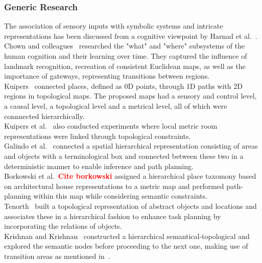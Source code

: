 \documentclass[twocolumn,letterpaper]{IEEEAerospaceCLS}  %
\newcommand\todo[1]{\textbf{\textcolor{red}{#1}}}
\begin{document}
\subsubsection{Generic Research} \label{sssec:ResLitHist}
The association of sensory inputs with symbolic systems and intricate representations has been discussed from a cognitive viewpoint by Harnad et al.~\cite{harnad_symbol_1990}.\\
Chown and colleagues~\cite{chown_prototypes_1995} researched the "what" and "where" subsystems of the human cognition and their learning over time. They captured the influence of landmark recognition, recreation of consistent Euclidean maps, as well as the importance of gateways, representing transitions between regions.\\
Kuipers~\cite{kuipers_spatial_2000} connected places, defined as 0D points, through 1D paths with 2D regions in topological maps. The proposed maps had a sensory and control level, a causal level, a topological level and a metrical level, all of which were connnected hierarchically.\\ Kuipers et al.~\cite{kuipers_local_2004} also conducted experiments where local metric room representations were linked through topological constraints.\\
Galindo et al.~\cite{galindo_robot_2008} connected a spatial hierarchical representation consisting of areas and objects with a terminological box and connected between these two in a deterministic manner to enable inference and path planning.\\
Borkowski et al.~\todo{Cite borkowski} assigned a hierarchical place taxomony based on architectural house representations to a metric map and performed path-planning within this map while considering semantic constraints.\\
Tenorth~\cite{tenorth_knowrob-map_2010} built a topological representation of abstract objects and locations and associates these in a hierarchical fashion to enhance task planning by incorporating the relations of objects.\\
Krishnan and Krishnan~\cite{krishnan_visual_2010} constructed a hierarchical semantical-topological and explored the semantic nodes before proceeding to the next one, making use of transition areas as mentioned in~\cite{chown_prototypes_1995}.
\end{document}
